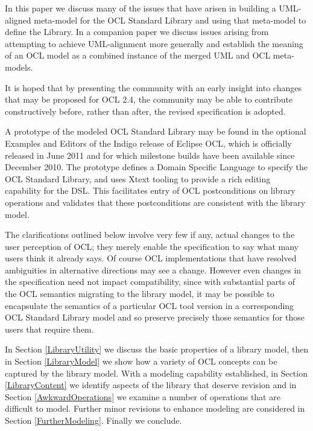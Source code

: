 \documentclass{eceasst}
\begin{document}
In this paper we discuss many of the issues that have arisen in building a UML-aligned meta-model for the OCL Standard Library and using that meta-model to define the Library. In a companion paper\cite{OCL-UML} we discuss issues arising from attempting to achieve UML-alignment more generally and establish the meaning of an OCL model as a combined instance of the merged UML and OCL meta-models.

It is hoped that by presenting the community with an early insight into changes that may be proposed for OCL 2.4, the community may be able to contribute constructively before, rather than after, the revised specification is adopted.

A prototype of the modeled OCL Standard Library may be found in the optional Examples and Editors of the Indigo release of Eclipse OCL\cite{MDT/OCL}, which is officially released in June 2011 and for which milestone builds have been available since December 2010. The prototype defines a Domain Specific Language to specify the OCL Standard Library, and uses Xtext\cite{TMF/Xtext} tooling to provide a rich editing capability for the DSL. This facilitates entry of OCL postconditions on library operations and validates that these postconditions are consistent with the library model.

The clarifications outlined below involve very few if any, actual changes to the user perception of OCL; they merely enable the specification to say what many users think it already says. Of course OCL implementations that have resolved ambiguities in alternative directions may see a change. However even changes in the specification need not impact compatibility, since with substantial parts of the OCL semantics migrating to the library model, it may be possible to encapsulate the semantics of a particular OCL tool version in a corresponding OCL Standard Library model and so preserve precisely those semantics for those users that require them.

In Section \ref{LibraryUtility} we discuss the basic properties of a library model, then in Section \ref{LibraryModel} we show how a variety of OCL concepts can be captured by the library model. With a modeling capability established, in Section \ref{LibraryContent} we identify aspects of the library that deserve revision and in Section \ref{AwkwardOperations} we examine a number of operations that are difficult to model. Further minor revisions to enhance modeling are considered in Section \ref{FurtherModeling}. Finally we conclude. 
\end{document}
